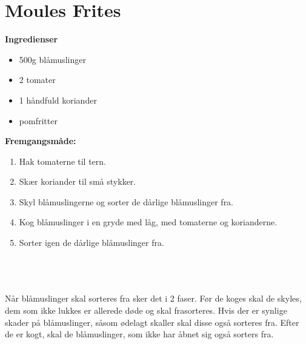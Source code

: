 \documentclass{book}
\begin{document}
\newpage \section{Moules Frites}
\begin{minipage}[t]{0.5\textwidth}
\textbf{Ingredienser}
\begin{itemize}
    \item 500g blåmuslinger
    \item 2 tomater
    \item 1 håndfuld koriander
    \item pomfritter
\end{itemize}
\end{minipage}
\begin{minipage}[t]{0.5\textwidth}
\textbf{Fremgangsmåde:}
\begin{enumerate}
    \item Hak tomaterne til tern.
    \item Skær koriander til små stykker.
    \item Skyl blåmuslingerne og sorter de dårlige blåmuslinger fra.
    \item Kog blåmuslinger i en gryde med låg, med tomaterne og korianderne.
    \item Sorter igen de dårlige blåmuslinger fra.
\end{enumerate}
\end{minipage}
\\ \\ \\ 
Når blåmuslinger skal sorteres fra sker det i 2 faser. Før de koges skal de skyles, dem som ikke lukkes er allerede døde og skal frasorteres. Hvis der er synlige skader på blåmuslinger, såsom ødelagt skaller skal disse også sorteres fra. Efter de er kogt, skal de blåmuslinger, som ikke har åbnet sig også sorters fra.
\newpage
\end{document}
